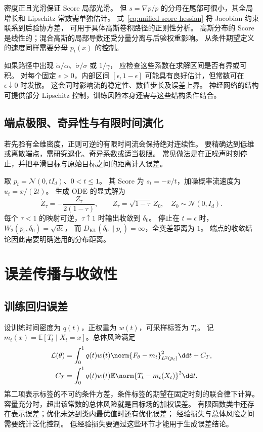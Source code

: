 密度正且光滑保证 Score 局部光滑。
但 \(s=\nabla p/p\) 的分母在尾部可很小，其全局增长和 Lipschitz 常数需单独估计。
式~\eqref{eq:unified-score-hessian} 将 Jacobian 约束联系到后验协方差，
可用于具体高斯卷积路径的正则性分析。
高斯分布的 Score 是线性的；混合高斯的局部导数还受分量分离与后验权重影响。
从条件期望定义的速度同样需要分母 \(p_t(x)\) 的控制。

如果路径中出现 \(\dot\alpha/\alpha\)、\(\dot\sigma/\sigma\) 或 \(1/\gamma\)，
应检查这些系数在求解区间是否有界或可积。
对每个固定 \(\epsilon>0\)，内部区间 \([\epsilon,1-\epsilon]\)
可能具有良好估计，但常数可在 \(\epsilon\downarrow0\) 时发散。
这会同时影响流的稳定性、数值步长及误差上界。
神经网络的结构可提供部分 Lipschitz 控制，训练风险本身还需与这些结构条件结合。

\subsection{端点极限、奇异性与有限时间演化}

若先验有全维密度，正则可逆的有限时间流会保持绝对连续性。
要精确达到低维或离散端点，需研究退化、奇异系数或适当极限。
常见做法是在正噪声时刻停止，并把平滑目标与原始目标之间的距离计入误差。

\begin{example}[到达点质量的奇异生成流]
取 \(p_t=\mathcal N(0,tI_d)\)、\(0<t\le1\)。
其 Score 为 \(s_t=-x/t\)，加噪概率流速度为 \(u_t=x/(2t)\)。
生成 ODE 的显式解为
\[
 \dot Z_\tau=-\frac{Z_\tau}{2(1-\tau)},\qquad
 Z_\tau=\sqrt{1-\tau}\,Z_0,\quad Z_0\sim\mathcal N(0,I_d).
\]
每个 \(\tau<1\) 的映射可逆，\(\tau\uparrow1\) 时输出收敛到 \(\delta_0\)。
停止在 \(t=\epsilon\) 时，\(W_2(p_\epsilon,\delta_0)=\sqrt{d\epsilon}\)，
而 \(D_{\mathrm{KL}}(\delta_0\|p_\epsilon)=\infty\)，全变差距离为 \(1\)。
端点的收敛结论因此需要明确选用的分布距离。
\end{example}

\section{误差传播与收敛性}
\label{sec:unified-errors}

\subsection{训练回归误差}

设训练时间密度为 \(q(t)\)，正权重为 \(w(t)\)，可采样标签为 \(T_t\)。
记 \(m_t(x)=\mathbb E[T_t\mid X_t=x]\)。总体风险满足
\begin{equation}
 \begin{aligned}
 \mathcal L(\theta)&=\int_0^1q(t)w(t)
             \norm{F_\theta-m_t}_{L^2(p_t)}^2\dd t+C_T,\\
 C_T&=\int_0^1q(t)w(t)\mathbb E\norm{T_t-m_t(X_t)}^2\dd t.
 \end{aligned}
 \label{eq:unified-regression-error}
\end{equation}
第二项表示标签的不可约条件方差，条件标签的期望在固定时刻的联合律下计算。
容量充分时，超出该常数的总体风险就是目标场的加权误差。
有限函数类中还存在表示误差；优化未达到类内最优值时还有优化误差；
经验损失与总体风险之间需要统计泛化控制。
低经验损失要通过这些环节才能用于生成误差结论。

